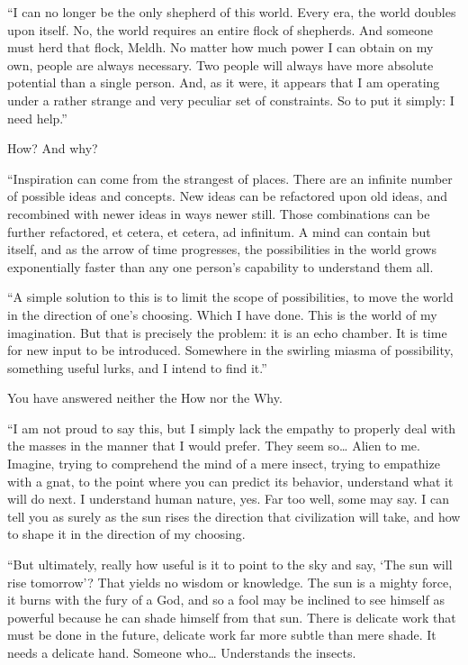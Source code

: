 “I can no longer be the only shepherd of this world. Every era, the world doubles upon itself. No, the world requires an entire flock of shepherds. And someone must herd that flock, Meldh. No matter how much power I can obtain on my own, people are always necessary. Two people will always have more absolute potential than a single person. And, as it were, it appears that I am operating under a rather strange and very peculiar set of constraints. So to put it simply: I need help.”

How? And why?

“Inspiration can come from the strangest of places. There are an infinite number of possible ideas and concepts. New ideas can be refactored upon old ideas, and recombined with newer ideas in ways newer still. Those combinations can be further refactored, et cetera, et cetera, ad infinitum. A mind can contain but itself, and as the arrow of time progresses, the possibilities in the world grows exponentially faster than any one person’s capability to understand them all.

“A simple solution to this is to limit the scope of possibilities, to move the world in the direction of one’s choosing. Which I have done. This is the world of my imagination. But that is precisely the problem: it is an echo chamber. It is time for new input to be introduced. Somewhere in the swirling miasma of possibility, something useful lurks, and I intend to find it.”

You have answered neither the How nor the Why.

“I am not proud to say this, but I simply lack the empathy to properly deal with the masses in the manner that I would prefer. They seem so… Alien to me. Imagine, trying to comprehend the mind of a mere insect, trying to empathize with a gnat, to the point where you can predict its behavior, understand what it will do next. I understand human nature, yes. Far too well, some may say. I can tell you as surely as the sun rises the direction that civilization will take, and how to shape it in the direction of my choosing.

“But ultimately, really how useful is it to point to the sky and say, ‘The sun will rise tomorrow’? That yields no wisdom or knowledge. The sun is a mighty force, it burns with the fury of a God, and so a fool may be inclined to see himself as powerful because he can shade himself from that sun. There is delicate work that must be done in the future, delicate work far more subtle than mere shade. It needs a delicate hand. Someone who… Understands the insects.

